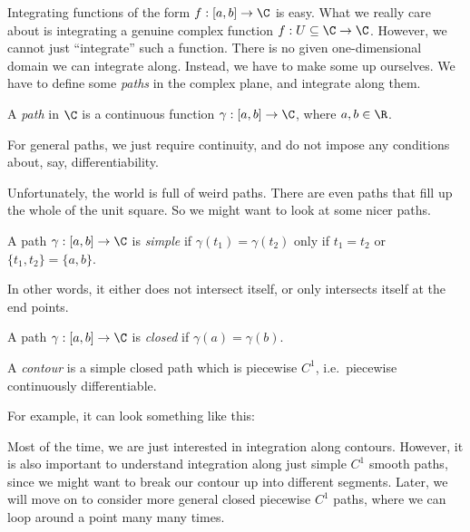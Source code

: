 \documentclass[a4paper]{article}
\begin{document}
Integrating functions of the form $f: [a, b] \to \C$ is easy. What we really care about is integrating a genuine complex function $f: U \subseteq \C \to \C$. However, we cannot just ``integrate'' such a function. There is no given one-dimensional domain we can integrate along. Instead, we have to make some up ourselves. We have to define some \emph{paths} in the complex plane, and integrate along them.

\begin{defi}[Path]
  A \emph{path} in $\C$ is a continuous function $\gamma: [a, b] \to \C$, where $a, b\in \R$.
\end{defi}
For general paths, we just require continuity, and do not impose any conditions about, say, differentiability.

Unfortunately, the world is full of weird paths. There are even paths that fill up the whole of the unit square. So we might want to look at some nicer paths.

\begin{defi}
  A path $\gamma: [a, b] \to \C$ is \emph{simple} if $\gamma(t_1) = \gamma(t_2)$ only if $t_1 = t_2$ or $\{t_1, t_2\} = \{a, b\}$.
\end{defi}
In other words, it either does not intersect itself, or only intersects itself at the end points.

\begin{defi}
  A path $\gamma: [a, b] \to \C$ is \emph{closed} if $\gamma(a) = \gamma(b)$.
\end{defi}

\begin{defi}[Contour]
  A \emph{contour} is a simple closed path which is piecewise $C^1$, i.e.\ piecewise continuously differentiable.
\end{defi}

For example, it can look something like this:
\begin{center}
\end{center}
Most of the time, we are just interested in integration along contours. However, it is also important to understand integration along just simple $C^1$ smooth paths, since we might want to break our contour up into different segments. Later, we will move on to consider more general closed piecewise $C^1$ paths, where we can loop around a point many many times.
\end{document}
